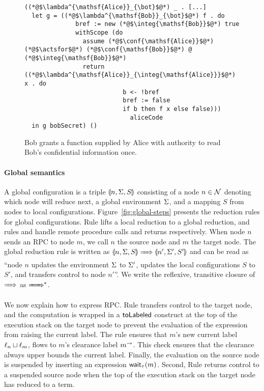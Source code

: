 \begin{figure}
\centering
\begin{lstlisting}
((*@$\lambda^{\mathsf{Alice}}_{\bot}$@*) _ . [...]
  let g = ((*@$\lambda^{\mathsf{Bob}}_{\bot}$@*) f . do
              bref := new (*@$\integ{\mathsf{Bob}}$@*) true
              withScope (do
                assume (*@$\conf{\mathsf{Alice}}$@*) (*@$\actsfor$@*) (*@$\conf{\mathsf{Bob}}$@*) @ (*@$\integ{\mathsf{Bob}}$@*)
                return ((*@$\lambda^{\mathsf{Alice}}_{\integ{\mathsf{Alice}}}$@*) x . do
                           b <- !bref
                           bref := false
                           if b then f x else false)))
                             aliceCode
  in g bobSecret) ()
\end{lstlisting}
\caption{Bob grants a function supplied by Alice with authority to read Bob's confidential information once. }
\label{fig:use-case-for-fluid-scope}
\end{figure}

\paragraph{Global semantics}
A global configuration is a triple $\llparenthesis n, \Sigma, S \rrparenthesis$ consisting of a node $n \in \mathcal{N}$ denoting which node will reduce next, a global environment $\Sigma$, and a mapping $S$ from nodes to local configurations. Figure~\ref{fig:global-steps} presents the reduction rules for global configurations. Rule  lifts a local reduction to a global reduction, and rules  and  handle remote procedure calls and returns respectively. When node $n$ sends an RPC to node $m$, we call $n$ the source node and $m$ the target node. The global reduction rule is written as $\gconfig{n}{\env}{S} \gstepsto \gconfig{n'}{\env'}{S'}$ and can be read as ``node $n$ updates the environment $\Sigma$ to $\Sigma'$, updates the local configurations $S$ to $S'$, and transfers control to node $n'$''. We write the reflexive, transitive closure of $\gstepsto$ as $\gstepstos$.

We now explain how to express RPC. Rule  transfers control to the target node, and the computation is wrapped in a $\mathsf{toLabeled}$ construct at the top of the execution stack on the target node to prevent the evaluation of the expression from raising the current label.
The rule ensures that $m$'s new current label $\ell_n \sqcup \ell_m$, flows to $m$'s clearance label $m^{\rightarrow}$. This check ensures that the clearance always upper bounds the current label.
Finally, the evaluation on the source node is suspended by inserting an expression $\wait{m}[\type]$. Second, Rule  returns control to a suspended source node when the top of the execution stack on the target node has reduced to a term.

